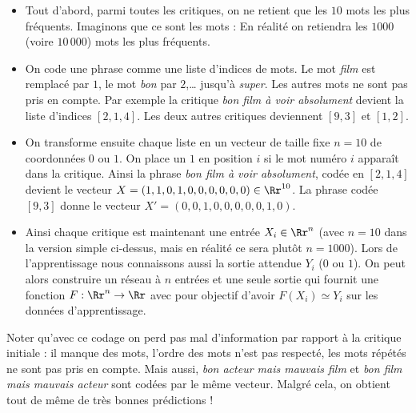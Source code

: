 \documentclass[11pt,class=report,crop=false]{standalone}
\begin{document}
\begin{itemize}
  \item Tout d'abord, parmi toutes les critiques, on ne retient que les $10$ mots les plus fréquents. Imaginons que ce sont les mots :
  En réalité on retiendra les $1000$ (voire $10\,000$) mots les plus fréquents.
  
  
  \item On code une phrase comme une liste d'indices de mots.
  Le mot \og{}\emph{film}\fg{} est remplacé par $1$, le mot \og{}\emph{bon}\fg{} par $2$,\ldots{} jusqu'à  \og{}\emph{super}\fg{}. Les autres mots ne sont pas pris en compte.
  Par exemple la critique \og{}\emph{bon film à voir absolument}\fg{} devient la liste d'indices 
  $[2, 1, 4]$. Les deux autres critiques deviennent $[9, 3]$ et $[1, 2]$.
    
  \item On transforme ensuite chaque liste en un vecteur de taille fixe $n=10$ de coordonnées $0$ ou $1$. On place un $1$ en position $i$ si le mot numéro $i$ apparaît dans la critique.
  Ainsi la phrase \og{}\emph{bon film à voir absolument}\fg{}, codée en $[2, 1, 4]$ devient le vecteur
  $X = (1, 1, 0, 1, 0, 0, 0, 0, 0, 0) \in \Rr^{10}$.
  La phrase codée $[9, 3]$ donne le vecteur $X'=(0, 0, 1, 0, 0, 0, 0, 0, 1, 0)$.
  

   
  \item Ainsi chaque critique est maintenant une entrée $X_i \in \Rr^n$ (avec $n=10$ dans la version simple ci-dessus, mais en réalité ce sera plutôt $n=1000$). Lors de l'apprentissage nous connaissons aussi la sortie attendue $Y_i$ ($0$ ou $1$). On peut alors construire un réseau à $n$ entrées et une seule sortie qui fournit une fonction $F : \Rr^n \to \Rr$ avec pour objectif d'avoir
  $F(X_i) \simeq Y_i$ sur les données d'apprentissage.
  
\end{itemize}

Noter qu'avec ce codage on perd pas mal d'information par rapport à la critique initiale : il manque des mots, l'ordre des mots n'est pas respecté, les mots répétés ne sont pas pris en compte. Mais aussi, \og{}\emph{bon acteur mais mauvais film}\fg{} et \og{}\emph{bon film mais mauvais acteur}\fg{} sont codées par le même vecteur. Malgré cela, on obtient tout de même de très bonnes prédictions !
 
\end{document}
